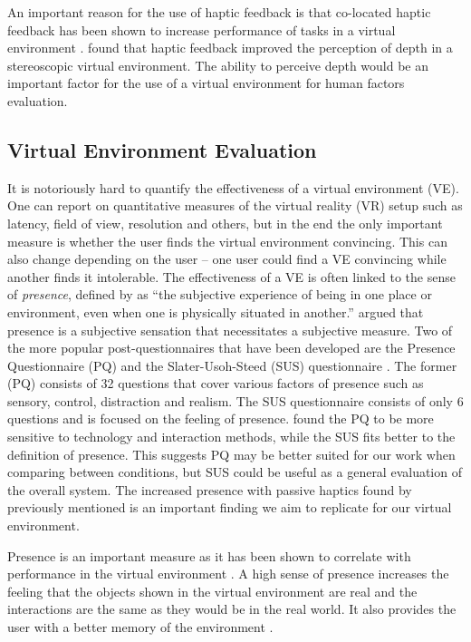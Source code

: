 An important reason for the use of haptic feedback is that co-located haptic feedback has been shown to increase performance of tasks in a virtual environment \citep{swapp_interaction_2006}.
\citet{bouguila_effect_2000} found that haptic feedback improved the perception of depth in a stereoscopic virtual environment.
The ability to perceive depth would be an important factor for the use of a virtual environment for human factors evaluation.

\subsection{Virtual Environment Evaluation}
\label{virtual-environment-evaluation}

It is notoriously hard to quantify the effectiveness of a virtual environment (VE).
One can report on quantitative measures of the virtual reality (VR) setup such as latency, field of view, resolution and others, but in the end the only important measure is whether the user finds the virtual environment convincing.
This can also change depending on the user -- one user could find a VE convincing while another finds it intolerable.
The effectiveness of a VE is often linked to the sense of \emph{presence}, defined by \citet{witmer_measuring_1998} as ``the subjective experience of being in one place or environment, even when one is physically situated in another.''
\citet{sheridan_musings_1992} argued that presence is a subjective sensation that necessitates a subjective measure.
Two of the more popular post-questionnaires that have been developed are the Presence Questionnaire (PQ) \citep{witmer_measuring_1998} and the Slater-Usoh-Steed (SUS) questionnaire \citep{slater_depth_1994}.
The former (PQ) consists of 32 questions that cover various factors of presence such as sensory, control, distraction and realism.
The SUS questionnaire consists of only 6 questions and is focused on the feeling of presence.
\citet{nystad_comparison_2004} found the PQ to be more sensitive to technology and interaction methods, while the SUS fits better to the definition of presence.
This suggests PQ may be better suited for our work when comparing between conditions, but SUS could be useful as a general evaluation of the overall system.
The increased presence with passive haptics found by \citet{insko_passive_2001} previously mentioned is an important finding we aim to replicate for our virtual environment.

Presence is an important measure as it has been shown to correlate with performance in the virtual environment \citep{youngblut_relationship_2003}.
A high sense of presence increases the feeling that the objects shown in the virtual environment are real and the interactions are the same as they would be in the real world.
It also provides the user with a better memory of the environment \citep{dinh_evaluating_1999}.

